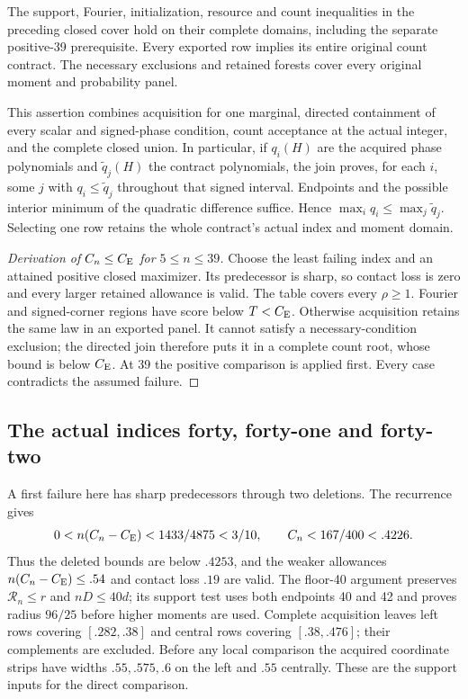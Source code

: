 \begin{proposition}
\label{j:finite:numerical539}
The support, Fourier, initialization, resource and count inequalities
in the preceding closed cover hold on their complete domains, including
the separate positive-39 prerequisite. Every exported row implies its
entire original count contract. The necessary exclusions and retained
forests cover every original moment and probability panel.
\end{proposition}
This assertion combines acquisition for one marginal, directed
containment of every scalar and signed-phase condition, count acceptance
at the actual integer, and the complete closed union. In particular,
if $q_i(H)$ are the acquired phase polynomials and
$\widetilde q_j(H)$ the contract polynomials, the join proves, for each
$i$, some $j$ with $q_i\le\widetilde q_j$ throughout that signed interval.
Endpoints and the possible interior minimum of the quadratic difference
suffice. Hence $\max_iq_i\le\max_j\widetilde q_j$. Selecting one row
retains the whole contract's actual index and moment domain.

\begin{proof}[Derivation of $C_n\le C_{\mathrm E}$ for $5\le n\le39$]
Choose the least failing index and an attained positive closed maximizer.
Its predecessor is sharp, so contact loss is zero and every larger
retained allowance is valid. The table covers every $\rho\ge1$.
Fourier and signed-corner regions have score below $T<C_{\mathrm E}$.
Otherwise acquisition retains the same law in an exported panel.
It cannot satisfy a necessary-condition exclusion; the directed join
therefore puts it in a complete count root, whose bound is below $C_{\mathrm E}$.
At 39 the positive comparison is applied first. Every case contradicts
the assumed failure.
\end{proof}

\subsection{The actual indices forty, forty-one and forty-two}
\label{j:finite:4042}
A first failure here has sharp predecessors through two deletions.
The recurrence gives
\[
 0<n(C_n-C_{\mathrm E})<1433/4875<3/10,\qquad C_n<167/400<.4226.
\]
Thus the deleted bounds are below $.4253$, and the weaker allowances
$n(C_n-C_{\mathrm E})\le.54$ and contact loss $.19$ are valid.
The floor-40 argument preserves $\mathcal R_n\le r$ and $nD\le40d$;
its support test uses both endpoints 40 and 42 and proves radius $96/25$
before higher moments are used. Complete acquisition leaves left rows
covering $[.282,.38]$ and central rows covering $[.38,.476]$; their
complements are excluded. Before any local comparison the acquired
coordinate strips have widths $.55,.575,.6$ on the left and $.55$
centrally. These are the support inputs for the direct comparison.

